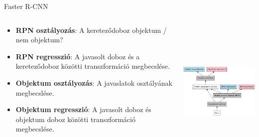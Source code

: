 \documentclass[english, aspectratio=169]{beamer}
\begin{document}
	\begin{frame}{Faster R-CNN}
		\begin{columns}
			\begin{column}{.5\textwidth}
				\begin{itemize}
					\item \textbf{RPN osztályozás}: A kereteződoboz objektum / nem objektum?
					\item \textbf{RPN regresszió}: A javasolt doboz és a kereteződoboz közötti transzformáció megbecslése.
					\item \textbf{Objektum osztályozás}: A javaslatok osztályának megbecslése.
					\item \textbf{Objektum regresszió}: A javasolt doboz és objektum doboz közötti transzformáció megbecslése. 
				\end{itemize}
			\end{column}
			\begin{column}{.5\textwidth}
				\begin{center}
					\includegraphics[width=7cm, height=7cm, keepaspectratio]{graphs/od_7.png}
				\end{center}
			\end{column}
		\end{columns}
	\end{frame}
	
\end{document}
